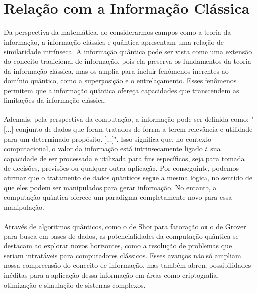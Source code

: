 \documentclass[11pt]{article}
\begin{document}
\maketitle
\section{Relação com a Informação Clássica}
Da perspectiva da matemática, ao considerarmos campos como a teoria da informação, a informação clássica e quântica apresentam uma relação de similaridade intrínseca. A informação quântica pode ser vista como uma extensão do conceito tradicional de informação, pois ela preserva os fundamentos da teoria da informação clássica, mas os amplia para incluir fenômenos inerentes ao domínio quântico, como a superposição e o entrelaçamento. Esses fenômenos permitem que a informação quântica ofereça capacidades que transcendem as limitações da informação clássica. \\ \\
Ademais, pela perspectiva da computação, a informação pode ser definida como: "[...] conjunto de dados que foram tratados de forma a terem relevância e utilidade para um determinado propósito. [...]". Isso significa que, no contexto computacional, o valor da informação está intrinsecamente ligado à sua capacidade de ser processada e utilizada para fins específicos, seja para tomada de decisões, previsões ou qualquer outra aplicação. Por conseguinte, podemos afirmar que o tratamento de dados quânticos segue a mesma lógica, no sentido de que eles podem ser manipulados para gerar informação. No entanto, a computação quântica oferece um paradigma completamente novo para essa manipulação. \\ \\
Através de algoritmos quânticos, como o de Shor para fatoração ou o de Grover para busca em bases de dados, as potencialidades da computação quântica se destacam ao explorar novos horizontes, como a resolução de problemas que seriam intratáveis para computadores clássicos. Esses avanços não só ampliam nossa compreensão do conceito de informação, mas também abrem possibilidades inéditas para a aplicação dessa informação em áreas como criptografia, otimização e simulação de sistemas complexos.


\maketitle
\end{document}
